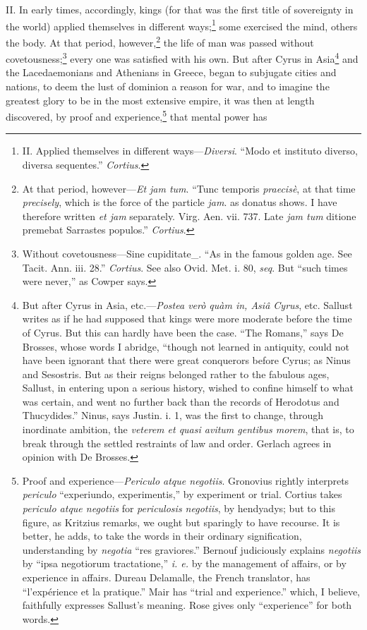 II. In early times, accordingly, kings (for that was the first title
of sovereignty in the world) applied themselves in different ways;\footnote{II. Applied themselves in different ways—\emph{Diversi}. ``Modo
et instituto diverso, diversa sequentes.'' \emph{Cortius}.}
some exercised the mind, others the body. At that period, however,\footnote{At that period, however—\emph{Et jam tum}. ``Tunc temporis
\emph{praecisè}, at that time \emph{precisely}, which is the force of the
particle \emph{jam}. as donatus shows. I have therefore written \emph{et jam}
separately. Virg. Aen. vii. 737. Late \emph{jam tum} ditione premebat
Sarrastes populos.'' \emph{Cortius}.}
the life of man was passed without covetousness;\footnote{Without covetousness—Sine cupiditate\_. ``As in the famous
golden age. See Tacit. Ann. iii. 28.'' \emph{Cortius}. See also Ovid. Met.
i. 80, \emph{seq}. But ``such times were never,'' as Cowper says.} every one was
satisfied with his own. But after Cyrus in Asia\footnote{But after Cyrus in Asia, etc.—\emph{Postea verò quàm in, Asiâ
Cyrus}, etc. Sallust writes as if he had supposed that kings were more
moderate before the time of Cyrus. But this can hardly have been the
case. ``The Romans,'' says De Brosses, whose words I abridge, ``though
not learned in antiquity, could not have been ignorant that there were
great conquerors before Cyrus; as Ninus and Sesostris. But as their
reigns belonged rather to the fabulous ages, Sallust, in entering upon
a serious history, wished to confine himself to what was certain, and
went no further back than the records of Herodotus and Thucydides.''
Ninus, says Justin. i. 1, was the first to change, through inordinate
ambition, the \emph{veterem et quasi avitum gentibus morem}, that is, to
break through the settled restraints of law and order. Gerlach agrees
in opinion with De Brosses.} and the
Lacedaemonians and Athenians in Greece, began to subjugate cities and
nations, to deem the lust of dominion a reason for war, and to imagine
the greatest glory to be in the most extensive empire, it was then at
length discovered, by proof and experience,\footnote{Proof and experience—\emph{Periculo atque negotiis}. Gronovius
rightly interprets \emph{periculo} ``experiundo, experimentis,'' by
experiment or trial. Cortius takes \emph{periculo atque negotiis} for
\emph{periculosis negotiis}, by hendyadys; but to this figure, as Kritzius
remarks, we ought but sparingly to have recourse. It is better, he
adds, to take the words in their ordinary signification, understanding
by \emph{negotia} ``res graviores.'' Bernouf judiciously explains \emph{negotiis}
by ``ipsa negotiorum tractatione,'' \emph{i. e.} by the management of affairs,
or by experience in affairs. Dureau Delamalle, the French translator,
has ``l'expérience et la pratique.'' Mair has ``trial and experience.''
which, I believe, faithfully expresses Sallust's meaning. Rose gives
only ``experience'' for both words.} that mental power has
